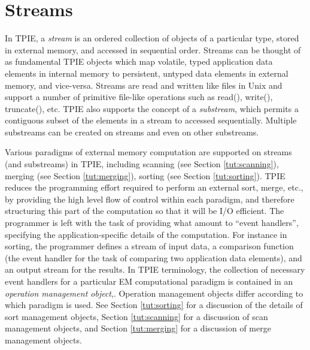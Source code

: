 \section{Streams}


In TPIE, a \emph{stream} is an ordered collection of objects
of a particular type, stored in external memory, and
accessed in sequential order. Streams can be thought of as
fundamental TPIE objects which map volatile, typed
application data elements in internal
memory to persistent, untyped data elements in external
memory, and vice-versa.  Streams are read and written like
files in Unix and support a number of primitive file-like
operations such as read(), write(), truncate(), etc. 
TPIE also supports the concept of a \emph{substream}, which
permits a contiguous subset of the elements in a stream to
accessed sequentially. Multiple substreams can be created on
streams and even on other substreams. 

Various paradigms of external memory computation are
supported on streams (and substreams) in TPIE, including
scanning (see Section \ref{tut:scanning}), merging (see
Section \ref{tut:merging}), sorting (see Section
\ref{tut:sorting}). TPIE reduces the programming effort
required to perform an external sort, merge, etc., by
providing the high level
flow of control within each paradigm, and therefore
structuring this part of the computation so that it will be
I/O efficient. The programmer is left with the task of
providing what amount to ``event handlers'', specifying the
application-specific details of the computation. For
instance in sorting, the programmer defines a stream of
input data, a comparison function (the event handler for the
task of comparing two application data elements), and an
output stream for the results. In TPIE terminology, the
collection of necessary event handlers for a particular EM
computational paradigm is contained in an {\em operation management
   object},. Operation
management objects differ according to which paradigm is
used.  See Section \ref{tut:sorting} for a discussion of the
details of sort management objects, Section \ref{tut:scanning}
for a discussion of scan management objects, and Section
\ref{tut:merging} for a discussion of merge management objects.

